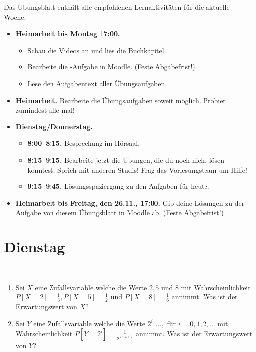 \documentclass{uebung_cs}
\begin{document}
Das Übungsblatt enthält alle empfohlenen Lernaktivitäten für die aktuelle Woche.

\begin{itemize}
\item \textbf{Heimarbeit bis Montag 17:00.}
    \begin{itemize}
    \item 
    Schau die Videos an und lies die Buchkapitel.
    \item Bearbeite die -Aufgabe in \href{https://moodle.studiumdigitale.uni-frankfurt.de/moodle/course/view.php?id=2241}{Moodle}. (Feste Abgabefrist!)
    \item Lese den Aufgabentext aller Übungsaufgaben.
    \end{itemize}
\item \textbf{Heimarbeit.} Bearbeite die Übungsaufgaben soweit möglich. Probier zumindest alle mal!
\item \textbf{Dienstag/Donnerstag.}
\begin{itemize}
    \item \textbf{8:00--8:15.} Besprechung im Hörsaal.
    \item \textbf{8:15--9:15.} Bearbeite jetzt die Übungen, die du noch nicht lösen konntest. Sprich mit anderen Studis! Frag das Vorlesungsteam um Hilfe!
    \item \textbf{9:15--9:45.} Lösungsspaziergang zu den Aufgaben für heute.
\end{itemize}

\item \textbf{Heimarbeit bis Freitag, den 26.11., 17:00.} Gib deine Lösungen zu der -Aufgabe von diesem Übungsblatt in \href{https://moodle.studiumdigitale.uni-frankfurt.de/moodle/course/view.php?id=2241}{Moodle} ab. (Feste Abgabefrist!)
\end{itemize}

\section*{Dienstag}

\begin{aufgabe}[Erwartungswerte]\
	\begin{enumerate}
		\item Sei $X$ eine Zufallsvariable welche die Werte $2,5$ und $8$ mit Wahrscheinlichkeit \newline $P[X=2] = \frac{1}{3}, P[X=5]=\frac{1}{2}$ und $P[X=8] = \frac{1}{6}$ annimmt. Was ist der Erwartungswert von $X$?\\
		
		\item Sei $Y$ eine Zufallsvariable welche die Werte $2^i,\dots,$ für $i = 0,1,2,\dots$ mit Wahrscheinlichkeit $P[Y=2^i] = \frac{1}{2^{(i+1)}}$ annimmt. Was ist der Erwartungswert von $Y$?
	\end{enumerate}	
\end{aufgabe}
\end{document}
